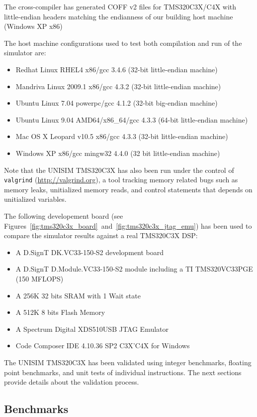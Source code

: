 The cross-compiler has generated COFF v2 files for TMS320C3X/C4X with little-endian headers matching the endianness of our building host machine (Windows XP x86)

\noindent The host machine configurations used to test both compilation and run of the simulator are:
\begin{itemize}
\item Redhat Linux RHEL4 x86/gcc 3.4.6 (32-bit little-endian machine)
\item Mandriva Linux 2009.1 x86/gcc 4.3.2 (32-bit little-endian machine)
\item Ubuntu Linux 7.04 powerpc/gcc 4.1.2 (32-bit big-endian machine)
\item Ubuntu Linux 9.04 AMD64/x86\_64/gcc 4.3.3 (64-bit little-endian machine)
\item Mac OS X Leopard v10.5 x86/gcc 4.3.3 (32-bit little-endian machine)
\item Windows XP x86/gcc mingw32 4.4.0 (32 bit little-endian machine)
\end{itemize}

Note that the UNISIM TMS320C3X has also been run under the control of \texttt{valgrind} (\url{http://valgrind.org}), a tool tracking memory related bugs such as memory leaks, unitialized memory reads, and control statements that depends on unitialized variables.

The following developement board (see Figures~\ref{fig:tms320c3x_board}~and~\ref{fig:tms320c3x_jtag_emu}) has been used to compare the simulator results against a real TMS320C3X DSP:
\begin{itemize}
\item A D.SignT DK.VC33-150-S2 development board
\item A D.SignT D.Module.VC33-150-S2 module including a TI TMS320VC33PGE (150 MFLOPS)
\item A 256K 32 bits SRAM with 1 Wait state
\item A 512K 8 bits Flash Memory
\item A Spectrum Digital XDS510USB JTAG Emulator
\item Code Composer IDE 4.10.36 SP2 C3X'C4X for Windows
\end{itemize}

The UNISIM TMS320C3X has been validated using integer benchmarks, floating point benchmarks, and unit tests of individual instructions.
The next sections provide details about the validation process.

\subsection{Benchmarks}

